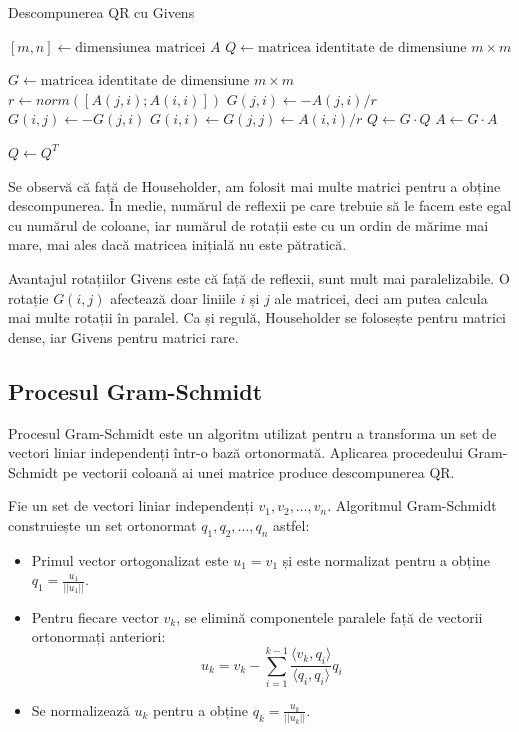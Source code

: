 \documentclass{exam}
\begin{document}
\begin{algorithm}
	\caption{Descompunerea QR cu Givens}
	\begin{algorithmic}[1]
		\State \( [m, n] \gets \text{dimensiunea matricei } A \)
		\State \( Q \gets \text{matricea identitate de dimensiune } m \times m \)

		\State \( G \gets \text{matricea identitate de dimensiune } m \times m \)
		\State \( r \gets norm([A(j, i); A(i, i)]) \)
		\State \( G(j, i) \gets - A(j, i) / r \)
		\State \( G(i, j) \gets - G(j, i) \)
		\State \( G(i, i) \gets G(j, j) \gets A(i, i) / r \)
		\State \( Q \gets G \cdot Q \)
		\State \( A \gets G \cdot A \)
		\EndIf
		\EndFor
		\EndFor

		\State \( Q \gets Q^T \)
	\end{algorithmic}
\end{algorithm}

Se observă că față de Householder, am folosit mai multe matrici pentru a
obține descompunerea. În medie, numărul de reflexii pe care trebuie să le facem
este egal cu numărul de coloane, iar numărul de rotații este cu un ordin de
mărime mai mare, mai ales dacă matricea inițială nu este pătratică.

Avantajul rotațiilor Givens este că față de reflexii, sunt mult mai
paralelizabile. O rotație $G(i, j)$ afectează doar liniile $i$ și $j$ ale
matricei, deci am putea calcula mai multe rotații în paralel. Ca și regulă,
Householder se folosește pentru matrici dense, iar Givens pentru matrici
rare.

\subsection{Procesul Gram-Schmidt}

Procesul Gram-Schmidt este un algoritm utilizat pentru a transforma un set de
vectori liniar independenți într-o bază ortonormată. Aplicarea procedeului
Gram-Schmidt pe vectorii coloană ai unei matrice produce descompunerea QR.

Fie un set de vectori liniar independenți $v_1, v_2, \dots, v_n$.
Algoritmul Gram-Schmidt construiește un set ortonormat $q_1, q_2, \dots, q_n$
astfel:
\begin{itemize}
	\item Primul vector ortogonalizat este $u_1 = v_1$
	      și este normalizat pentru a obține $q_1 = \frac{u_1}{||u_1||}$.
	\item Pentru fiecare vector $v_k$, se elimină componentele paralele față de
	      vectorii ortonormați anteriori:
	      \begin{equation*}
		      u_k = v_k - \sum_{i = 1}^{k - 1}\frac{\langle v_k, q_i \rangle}{\langle q_i, q_i \rangle}q_i
	      \end{equation*}
	\item Se normalizează $u_k$ pentru a obține $q_k = \frac{u_k}{||u_k||}$.
\end{itemize}
\end{document}
